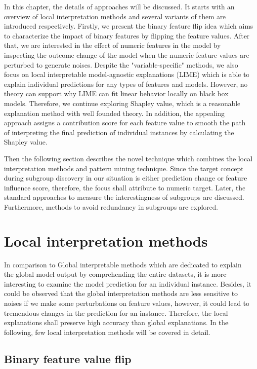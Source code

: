 In this chapter, the details of approaches will be discussed. It starts with an overview of local interpretation methods and several variants of them are introduced respectively. Firstly, we present the binary feature flip idea which aims to characterize the impact of binary features by flipping the feature values. After that, we are interested in the effect of numeric features in the model by inspecting the outcome change of the model when the numeric feature values are perturbed to generate noises. Despite the "variable-specific" methods, we also focus on local interpretable model-agnostic explanations (LIME) which is able to explain individual predictions for any types of features and models. However, no theory can support why LIME can fit linear behavior locally on black box models. Therefore, we continue exploring Shapley value, which is a reasonable explanation method with well founded theory. In addition, the appealing approach assigns a contribution score for each feature value to smooth the path of interpreting the final prediction of individual instances by calculating the Shapley value. 

Then the following section describes the novel technique which combines the local interpretation methods and pattern mining technique. Since the target concept during subgroup discovery in our situation is either prediction change or feature influence score, therefore, the focus shall attribute to numeric target. Later, the standard approaches to measure the interestingness of subgroups are discussed. Furthermore, methods to avoid redundancy in subgroups are explored. 

\section{Local interpretation methods}

In comparison to Global interpretable methods which are dedicated to explain the global model output by comprehending the entire datasets, it is more interesting to examine the model prediction for an individual instance. Besides, it could be observed that the global interpretation methods are less sensitive to noises if we make some perturbations on feature values, however, it could lead to tremendous changes in the prediction for an instance. Therefore, the local explanations shall preserve high accuracy than global explanations. In the following, few local interpretation methods will be covered in detail. 

\subsection{Binary feature value flip}

